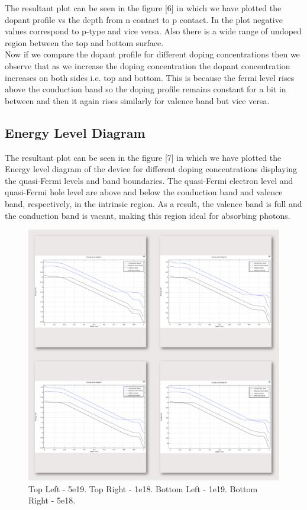 \documentclass[conference]{IEEEtran}
\begin{document}
The resultant plot can be seen in the figure [6] in which we have plotted the dopant profile vs the depth from n contact to p contact. In the plot negative values correspond to p-type and vice versa. Also there is a wide range of undoped region between the top and bottom surface.\\

Now if we compare the dopant profile for different doping concentrations then we observe that as we increase the doping concentration the dopant concentration increases on both sides i.e. top and bottom. This is because the fermi level rises above the conduction band so the doping profile remains constant for a bit in between and then it again rises similarly for valence band but vice versa.

\subsection{Energy Level Diagram}

The resultant plot can be seen in the figure [7] in which we have plotted the Energy level diagram of the device for different doping concentrations displaying the quasi-Fermi levels and band boundaries. The quasi-Fermi electron level and quasi-Fermi hole level are above and below the conduction band and valence band, respectively, in the intrinsic region. As a result, the valence band is full and the conduction band is vacant, making this region ideal for absorbing photons.\\

\begin{figure}
\begin{center}
\includegraphics[scale = 0.15]{Fermi.jpeg}
\caption{Top Left - 5e19. Top Right - 1e18. Bottom Left - 1e19. Bottom Right - 5e18.}
\end{center}
\end{figure}
\end{document}
